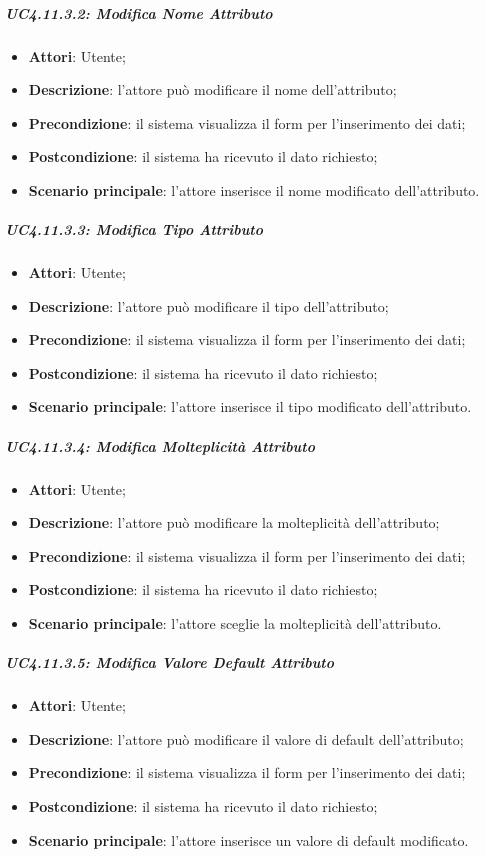 \subparagraph{UC4.11.3.2: Modifica Nome Attributo}
\label{UC4.11.3.2}
\begin{itemize}
	\item \textbf{Attori}: Utente;
	\item \textbf{Descrizione}: l'attore può modificare il nome dell'attributo;
	\item \textbf{Precondizione}: il sistema visualizza il form per l'inserimento dei dati;
	\item \textbf{Postcondizione}: il sistema ha ricevuto il dato richiesto;
	\item \textbf{Scenario principale}: l'attore inserisce il nome modificato dell'attributo.
\end{itemize}

\subparagraph{UC4.11.3.3: Modifica Tipo Attributo}
\label{UC4.11.3.3}
\begin{itemize}
	\item \textbf{Attori}: Utente;
	\item \textbf{Descrizione}: l'attore può modificare il tipo dell'attributo;
	\item \textbf{Precondizione}: il sistema visualizza il form per l'inserimento dei dati;
	\item \textbf{Postcondizione}: il sistema ha ricevuto il dato richiesto;
	\item \textbf{Scenario principale}: l'attore inserisce il tipo modificato dell'attributo.
\end{itemize}

\subparagraph{UC4.11.3.4: Modifica Molteplicità Attributo}
\label{UC4.11.3.4}
\begin{itemize}
	\item \textbf{Attori}: Utente;
	\item \textbf{Descrizione}: l'attore può modificare la molteplicità dell'attributo;
	\item \textbf{Precondizione}: il sistema visualizza il form per l'inserimento dei dati;
	\item \textbf{Postcondizione}: il sistema ha ricevuto il dato richiesto;
	\item \textbf{Scenario principale}: l'attore sceglie la molteplicità dell'attributo.
\end{itemize}

\subparagraph{UC4.11.3.5: Modifica Valore Default Attributo}
\label{UC4.11.3.5}
\begin{itemize}
	\item \textbf{Attori}: Utente;
	\item \textbf{Descrizione}: l'attore può modificare il valore di default dell'attributo;
	\item \textbf{Precondizione}: il sistema visualizza il form per l'inserimento dei dati;
	\item \textbf{Postcondizione}: il sistema ha ricevuto il dato richiesto;
	\item \textbf{Scenario principale}: l'attore inserisce un valore di default modificato.
\end{itemize}

